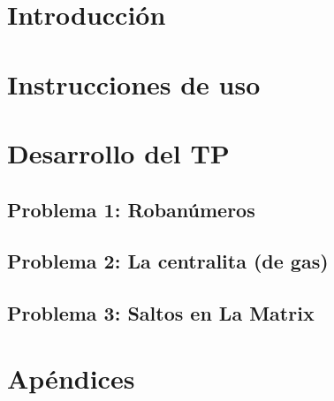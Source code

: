 \documentclass[11pt, a4paper, twoside]{article}
\begin{document}
{}
\newpage{\pagestyle{empty}\cleardoublepage}
\setcounter{page}{1}

\newpage{\pagestyle{empty}\tableofcontents\cleardoublepage}

\begin{TP2}
\section{Introducción}\label{sec:introduccion}

\newpage
\section{Instrucciones de uso}\label{sec:instrucciones}

\newpage

\section{Desarrollo del TP}\label{sec:desarrollo}
  
  \subsection{Problema 1: Robanúmeros}\label{subsec:ej1}
  
  \newpage
  
  \subsection{Problema 2: La centralita (de gas)}\label{subsec:ej2}
  
  \newpage
  
  \subsection{Problema 3: Saltos en La Matrix}
  \label{subsec:ej3}
  \newpage

\section{Apéndices}
  

\end{TP2}
\end{document}
